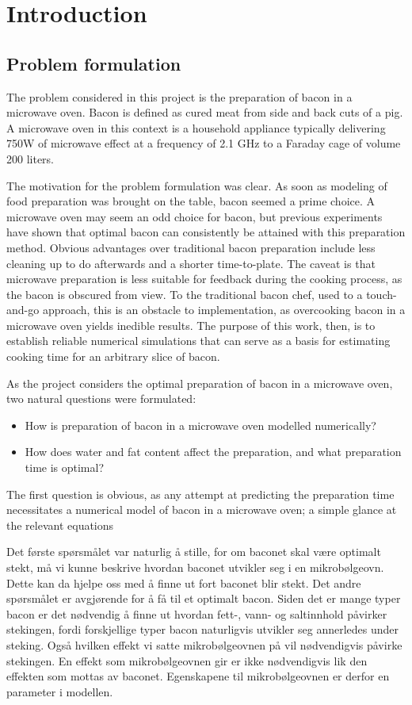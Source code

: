\chapter{Introduction}
\section{Problem formulation}
The problem considered in this project is the preparation of bacon in a microwave oven. Bacon is
defined as cured meat from side and back cuts of a pig. A microwave oven in this context is a
household appliance typically delivering 750W of microwave effect at a frequency of 2.1 GHz
to a Faraday cage of volume 200 liters. 

The motivation for the problem formulation was clear. As soon as modeling of food preparation was
brought on the table, bacon seemed a prime choice. A microwave oven may seem an odd choice for
bacon, but previous experiments have shown that optimal bacon can consistently be attained with this
preparation method. Obvious advantages over traditional bacon preparation include less cleaning up
to do afterwards and a shorter time-to-plate. The caveat is that microwave preparation is less
suitable for feedback during the cooking process, as the bacon is obscured from view. To the
traditional bacon chef, used to a touch-and-go approach, this is an obstacle to implementation, as
overcooking bacon in a microwave oven yields inedible results. The
purpose of this work, then, is to establish reliable numerical simulations that can serve as a basis
for estimating cooking time for an arbitrary slice of bacon.

As the project considers the optimal preparation of bacon in a microwave oven, two natural questions
were formulated:

\begin{itemize}
  \item How is preparation of bacon in a microwave oven modelled numerically?
  \item How does water and fat content affect the preparation, and what preparation time is optimal?
\end{itemize}

The first question is obvious, as any attempt at predicting the preparation time necessitates a
numerical model of bacon in a microwave oven; a simple glance at the relevant equations 


Det første spørsmålet var naturlig å stille, for om baconet skal være optimalt stekt, må vi kunne
beskrive hvordan baconet utvikler seg i en mikrobølgeovn. Dette kan da hjelpe oss med å finne ut
fort baconet blir stekt. Det andre spørsmålet er avgjørende for å få til et optimalt bacon. Siden
det er mange typer bacon er det nødvendig å finne ut hvordan fett-, vann- og saltinnhold påvirker
stekingen, fordi forskjellige typer bacon naturligvis utvikler seg annerledes under steking. Også
hvilken effekt vi satte mikrobølgeovnen på vil nødvendigvis påvirke stekingen. En effekt som
mikrobølgeovnen gir er ikke nødvendigvis lik den effekten som mottas av baconet. Egenskapene til
mikrobølgeovnen er derfor en parameter i modellen. 

